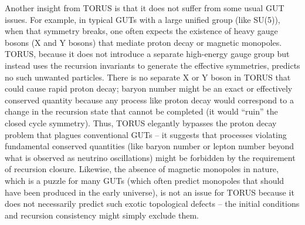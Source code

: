 \documentclass[
]{article}
\begin{document}
Another insight from TORUS is that it does not suffer from some usual
GUT issues. For example, in typical GUTs with a large unified group
(like SU(5)), when that symmetry breaks, one often expects the existence
of heavy gauge bosons (X and Y bosons) that mediate proton decay or
magnetic monopoles. TORUS, because it does not introduce a separate
high-energy gauge group but instead uses the recursion invariants to
generate the effective symmetries, predicts no such unwanted particles.
There is no separate X or Y boson in TORUS that could cause rapid proton
decay; baryon number might be an exact or effectively conserved quantity
because any process like proton decay would correspond to a change in
the recursion state that cannot be completed (it would ``ruin'' the
closed cycle symmetry). Thus, TORUS elegantly bypasses the proton decay
problem that plagues conventional GUTs -- it suggests that processes
violating fundamental conserved quantities (like baryon number or lepton
number beyond what is observed as neutrino oscillations) might be
forbidden by the requirement of recursion closure. Likewise, the absence
of magnetic monopoles in nature, which is a puzzle for many GUTs (which
often predict monopoles that should have been produced in the early
universe), is not an issue for TORUS because it does not necessarily
predict such exotic topological defects -- the initial conditions and
recursion consistency might simply exclude them.
\end{document}
